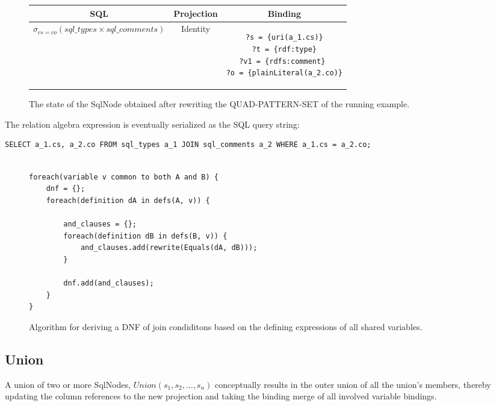 \documentclass[a4paper,twoside,bibtotoc,abstracton,12pt,BCOR=15mm]{scrreprt}
\begin{document}
\begin{figure}[!h]
\begin{tabular}{ccc}
\toprule
SQL & Projection & Binding \\
\midrule

$\sigma_{cs = co} \left ( sql\_types \times sql\_comments \right )$

&

Identity

&

\begin{minipage}{5cm}
\begin{scriptsize}
\begin{verbatim}
?s = {uri(a_1.cs)}
?t = {rdf:type}
?v1 = {rdfs:comment} 
?o = {plainLiteral(a_2.co)}
\end{verbatim} 
\end{scriptsize}
\end{minipage}

\\
\bottomrule
\end{tabular}
\caption{The state of the SqlNode obtained after rewriting the QUAD-PATTERN-SET of the running example.}
\end{figure}

The relation algebra expression is eventually serialized as the SQL query string:
\begin{lstlisting}
SELECT a_1.cs, a_2.co FROM sql_types a_1 JOIN sql_comments a_2 WHERE a_1.cs = a_2.co;
\end{lstlisting}


\begin{figure}
\begin{lstlisting} 

foreach(variable v common to both A and B) {
	dnf = {};
    foreach(definition dA in defs(A, v)) {
    
    	and_clauses = {};
    	foreach(definition dB in defs(B, v)) {
    		and_clauses.add(rewrite(Equals(dA, dB)));
    	}
    	
    	dnf.add(and_clauses);
    }
}
\end{lstlisting}
\caption{Algorithm for deriving a DNF of join condiditons based on the defining expressions of all shared variables.}
\label{alg:join}
\end{figure}



\subsection{Union}
A union of two or more SqlNodes, $Union(s_1, s_2, \ldots, s_n)$ conceptually results in the outer union of all
the union's members, thereby updating the column references to the new projection and taking the binding merge of all involved variable bindings.
\end{document}
